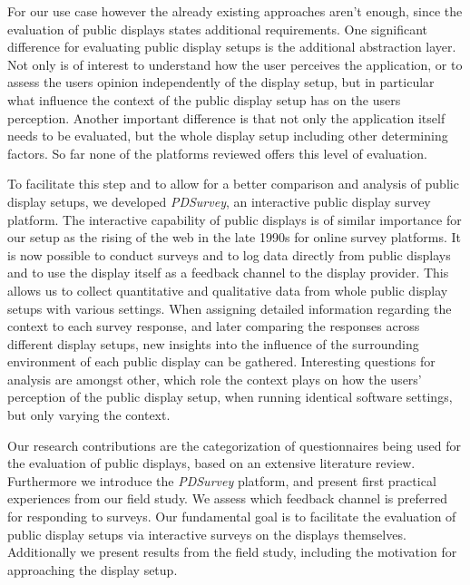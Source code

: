 	For our use case however the already existing approaches aren't enough, since the evaluation of public displays states additional requirements. One significant difference for evaluating public display setups is the additional abstraction layer. Not only is of interest to understand how the user perceives the application, or to assess the users opinion independently of the display setup, but in particular what influence the context of the public display setup has on the users perception. Another important difference is that not only the application itself needs to be evaluated, but the whole display setup including other determining factors. So far none of the platforms reviewed offers this level of evaluation.


	To facilitate this step and to allow for a better comparison and analysis of public display setups, we developed \textit{PDSurvey}, an interactive public display survey platform. The interactive capability of public displays is of similar importance for our setup as the rising of the web in the late 1990s for online survey platforms. It is now possible to conduct surveys and to log data directly from public displays and to use the display itself as a feedback channel to the display provider.
	This allows us to collect quantitative and qualitative data from whole public display setups with various settings. When assigning detailed information regarding the context to each survey response, and later comparing the responses across different display setups, new insights into the influence of the surrounding environment of each public display can be gathered. Interesting questions for analysis are amongst other, which role the context plays on how the users' perception of the public display setup, when running identical software settings, but only varying the context.


	Our research contributions are the categorization of questionnaires being used for the evaluation of public displays, based on an extensive literature review. Furthermore we introduce the \textit{PDSurvey} platform, and present first practical experiences from our field study. We assess which feedback channel is preferred for responding to surveys. Our fundamental goal is to facilitate the evaluation of public display setups via interactive surveys on the displays themselves. Additionally we present results from the field study, including the motivation for approaching the display setup.

